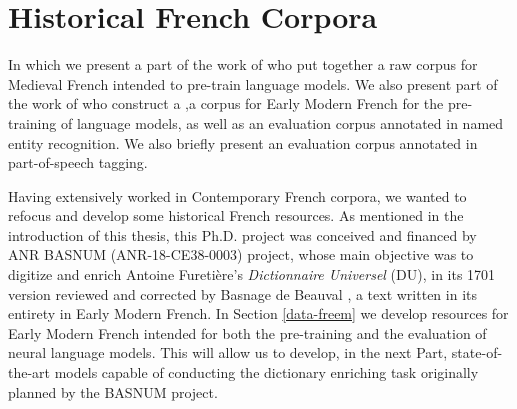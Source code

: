 \chapter{Historical French Corpora}\label{chap:historical}

\begin{center}
    \begin{minipage}{0.66\textwidth}
        \begin{small}
            In which we present a part of the work of \citet{grobol-etal-2022-bertrade} who put together a raw corpus for Medieval French intended to pre-train language models. We also present part of the work of \citet{gabay-etal-2022-from} who construct a \freemmax,a corpus for Early Modern French for the pre-training of language models, as well as \freemner an evaluation corpus annotated in named entity recognition. We also briefly present \freemlpm an evaluation corpus annotated in part-of-speech tagging.\footnotemark
        \end{small}
    \end{minipage}
    \vspace{0.5cm}
\end{center}


Having extensively worked in Contemporary French corpora, we wanted to refocus and develop some historical French resources. As mentioned in the introduction of this thesis, this Ph.D. project was conceived and financed by ANR BASNUM (ANR-18-CE38-0003) project, whose main objective was to digitize and enrich Antoine Furetière's \emph{Dictionnaire Universel} (DU), in its 1701 version reviewed and corrected by Basnage de Beauval \citep{furetiere-1701-dictionnaire}, a text written in its entirety in Early Modern French. In Section \ref{data-freem} we develop resources for Early Modern French intended for both the pre-training and the evaluation of neural language models. This will allow us to develop, in the next Part, state-of-the-art models capable of conducting the dictionary enriching task originally planned by the BASNUM project.

